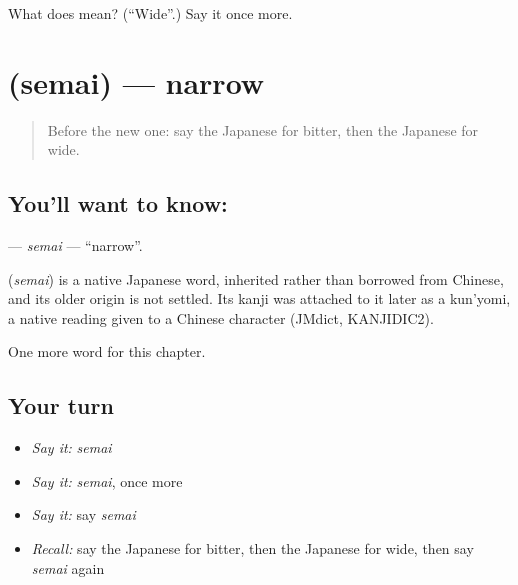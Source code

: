 \begin{tcolorbox}[breakable,colback=teal!4,colframe=teal!35!black,title={Before you move on}]
What does  mean? (\textquotedblleft{}Wide\textquotedblright{}.) Say it once more.
\end{tcolorbox}
\section[\texorpdfstring{\ja{せまい} (semai)}{せまい (semai)}]{ (semai) — narrow}

\label{lesson:JA-C50-semai}



\begin{quote}
Before the new one: say the Japanese for bitter, then the Japanese for wide.
\end{quote}

\subsection*{You'll want to know: }
\textbf{} — \emph{semai} — \textquotedblleft{}narrow\textquotedblright{}.

\begin{cousinweb}
\textbf{} (\emph{semai}) is a native Japanese word, inherited rather than borrowed from Chinese, and its older origin is not settled. Its kanji was attached to it later as a kun'yomi, a native reading given to a Chinese character (JMdict, KANJIDIC2).
\end{cousinweb}

\begin{grammarlens}[title={What you've built}]
One more word for this chapter.
\end{grammarlens}

\subsection*{Your turn}
\begin{itemize}
\raggedright
  \item \emph{Say it:} \emph{semai}
  \item \emph{Say it:} \emph{semai}, once more
  \item \emph{Say it:} say \emph{semai}
  \item \emph{Recall:} say the Japanese for bitter, then the Japanese for wide, then say \emph{semai} again
\end{itemize}

